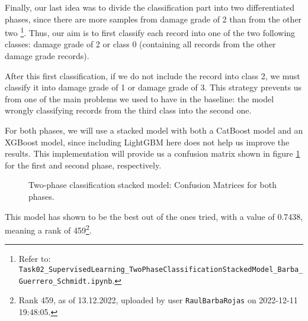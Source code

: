 Finally, our last idea was to divide the classification part into two differentiated phases, since there are more samples from damage grade of 2 than from the other two \footnote{Refer to: \texttt{Task02\_SupervisedLearning\_TwoPhaseClassificationStackedModel\_Barba\_Guerrero\_Schmidt.ipynb}.}. Thus, our aim is to first classify each record into one of the two following classes: damage grade of 2 or class 0 (containing all records from the other damage grade records).

After this first classification, if we do not include the record into class 2, we must classify it into damage grade of 1 or damage grade of 3. This strategy prevents us from one of the main problems we used to have in the baseline: the model wrongly classifying records from the third class into the second one.

For both phases, we will use a stacked model with both a CatBoost model and an XGBoost model, since including LightGBM here does not help us improve the results. This implementation will provide us a confusion matrix shown in figure \ref{PICTURE_confmatrix_ofc} for the first and second phase, respectively.

\begin{figure}[h!]
	\centering
	\caption{Two-phase classification stacked model: Confusion Matrices for both phases.}
	\label{PICTURE_confmatrix_ofc}
\end{figure}

This model has shown to be the best out of the ones tried, with a value of 0.7438, meaning a rank of 459\footnote{Rank 459, as of 13.12.2022, uploaded by user \texttt{RaulBarbaRojas} on 2022-12-11 19:48:05.}.